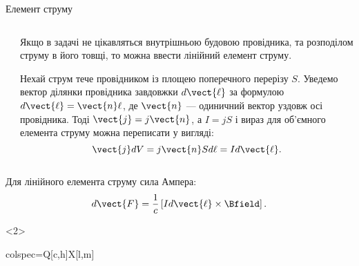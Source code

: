 \documentclass{beamer}
\begin{document}
\begin{frame}{Елемент струму}{}
\begin{onlyenv}
\begin{columns}
\begin{column}{0.3\linewidth}
		\end{column}
		\begin{column}{0.7\linewidth}
			\begin{block}{}\justifying
				Якщо в задачі не цікавляться
				внутрішньою будовою провідника, та розподілом струму в його товщі, то можна ввести \alert{лінійний елемент струму}.
			\end{block}
			\begin{block}{}\justifying\footnotesize
				Нехай струм тече провідником із площею поперечного перерізу $S$. Уведемо вектор ділянки провідника завдовжки $d\vect{\ell}$
				за формулою $d\vect{\ell} = \vect{n}\ell$, де $\vect{n}$ --- одиничний вектор уздовж осі провідника. Тоді $\vect{j} = j\vect{n}$,
				а $I = j S$ і вираз для об'ємного елемента струму можна переписати у вигляді:
				\begin{equation*}
					\vect{j}dV = j\vect{n} S d\ell  = I d\vect{\ell}.
				\end{equation*}
			\end{block}
		\end{column}
	\end{columns}
	\begin{block}{}
		Для лінійного елемента струму сила Ампера:
		\begin{equation*}
			d\vect{F} = \frac1c \left[ I d\vect{\ell} \times \Bfield\right].
		\end{equation*}
	\end{block}
\end{onlyenv}
\begin{onlyenv}<2>
\begin{tblr}{
colspec={Q[c,h]X[l,m]}
}
\end{tblr}
\end{onlyenv}
\end{frame}
\end{document}
